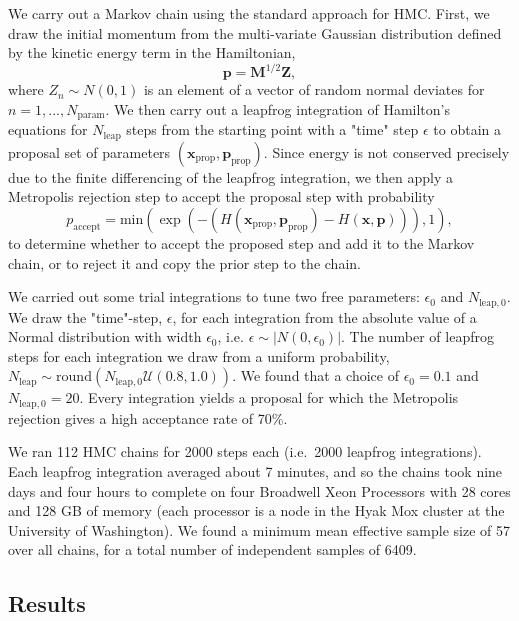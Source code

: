 \documentclass[twocolumn]{aastex63}
\begin{document}
We carry out a Markov chain using the standard approach for HMC. First, we draw the initial momentum from the multi-variate Gaussian distribution defined by the kinetic energy term in the Hamiltonian,
\begin{equation}
    \mathbf{p} = \mathbf{M}^{1/2} \mathbf{Z},
\end{equation}
where $Z_n \sim N(0,1)$ is an element of a vector of random normal deviates for $n=1,...,N_\mathrm{param}$.
We then carry out a leapfrog integration of Hamilton's equations for $N_\mathrm{leap}$ steps from the starting point with a "time" step $\epsilon$ to obtain a proposal set of parameters $(\mathbf{x}_\mathrm{prop},\mathbf{p}_\mathrm{prop})$.  Since energy is not conserved precisely due to the finite differencing of the leapfrog integration, we then apply a Metropolis rejection step to accept the proposal step with probability
\begin{equation}
    p_\mathrm{accept} = \mathrm{min}(\exp(-(H(\mathbf{x}_\mathrm{prop},\mathbf{p}_\mathrm{prop}) - H(\mathbf{x},\mathbf{p}))),1),
\end{equation}
to determine whether to accept the proposed step and add it to the Markov chain, or to reject it and copy the prior step to the chain.

We carried out some trial integrations to tune two free parameters:  $\epsilon_0$ and $N_{\mathrm{leap},0}$.  We draw the "time"-step, $\epsilon$, for each integration from the absolute value of a Normal distribution with width $\epsilon_0$, i.e. $\epsilon \sim \vert N(0,\epsilon_0) \vert$.
The number of leapfrog steps for each integration we draw from a uniform probability,
$N_\mathrm{leap} \sim \mathrm{round}(N_{\mathrm{leap},0} \mathcal{U}(0.8,1.0))$.  We found that a choice of $\epsilon_0 = 0.1$
and $N_{\mathrm{leap},0} = 20$.  Every integration yields a proposal for which the Metropolis rejection gives a high acceptance rate of 70\%.  

We ran 112 HMC chains for 2000 steps each (i.e.\ 2000 leapfrog integrations).   Each leapfrog integration averaged about 7 minutes, and so the chains took nine
days and four hours to complete on four Broadwell Xeon Processors with 28 cores and  128 GB of memory (each processor is a node in the Hyak Mox cluster at the University of Washington).
We found a minimum mean effective sample size of 57 over all chains, for a 
total number of independent samples of 6409.

\subsection{Results}
\end{document}

